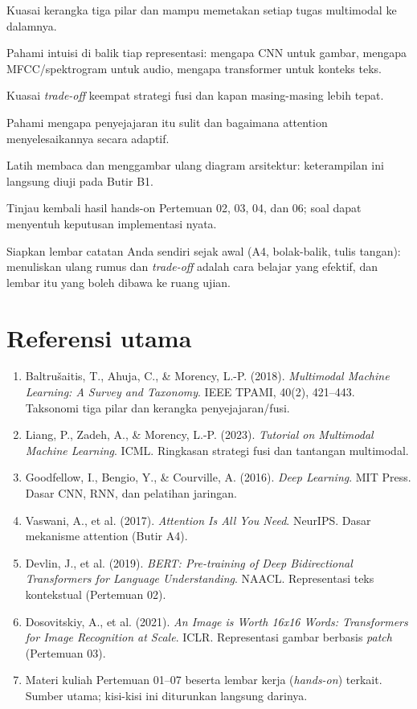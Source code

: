 \documentclass[12pt, a4paper]{article}
\begin{document}
\begin{filledstarlist}
  \item Kuasai kerangka tiga pilar dan mampu memetakan setiap tugas
        multimodal ke dalamnya.
  \item Pahami intuisi di balik tiap representasi: mengapa CNN untuk
        gambar, mengapa MFCC/spektrogram untuk audio, mengapa transformer untuk
        konteks teks.
  \item Kuasai \emph{trade-off} keempat strategi fusi dan kapan masing-masing
        lebih tepat.
  \item Pahami mengapa penyejajaran itu sulit dan bagaimana attention
        menyelesaikannya secara adaptif.
  \item Latih membaca dan menggambar ulang diagram arsitektur:
        keterampilan ini langsung diuji pada Butir B1.
  \item Tinjau kembali hasil hands-on Pertemuan 02, 03, 04, dan 06;
        soal dapat menyentuh keputusan implementasi nyata.
  \item Siapkan lembar catatan Anda sendiri sejak awal (A4, bolak-balik, tulis
        tangan): menuliskan ulang rumus dan \emph{trade-off} adalah cara belajar
        yang efektif, dan lembar itu yang boleh dibawa ke ruang ujian.
\end{filledstarlist}

\section{Referensi utama}\label{sec:referensi}

\begin{enumerate}
  \item Baltrušaitis, T., Ahuja, C., \& Morency, L.-P. (2018).
        \emph{Multimodal Machine Learning: A Survey and Taxonomy}.
        IEEE TPAMI, 40(2), 421--443. Taksonomi tiga pilar dan kerangka
        penyejajaran/fusi.
  \item Liang, P., Zadeh, A., \& Morency, L.-P. (2023).
        \emph{Tutorial on Multimodal Machine Learning}. ICML. Ringkasan strategi
        fusi dan tantangan multimodal.
  \item Goodfellow, I., Bengio, Y., \& Courville, A. (2016).
        \emph{Deep Learning}. MIT Press. Dasar CNN, RNN, dan pelatihan jaringan.
  \item Vaswani, A., et al. (2017). \emph{Attention Is All You Need}. NeurIPS. Dasar mekanisme attention
        (Butir A4).
  \item Devlin, J., et al. (2019). \emph{BERT: Pre-training of Deep Bidirectional
        Transformers for Language Understanding}. NAACL. Representasi teks kontekstual (Pertemuan 02).
  \item Dosovitskiy, A., et al. (2021). \emph{An Image is Worth 16x16 Words:
        Transformers for Image Recognition at Scale}. ICLR. Representasi gambar
        berbasis \emph{patch} (Pertemuan 03).
  \item Materi kuliah Pertemuan 01--07 beserta lembar kerja (\emph{hands-on})
        terkait. Sumber utama; kisi-kisi ini diturunkan langsung darinya.
\end{enumerate}
\end{document}
